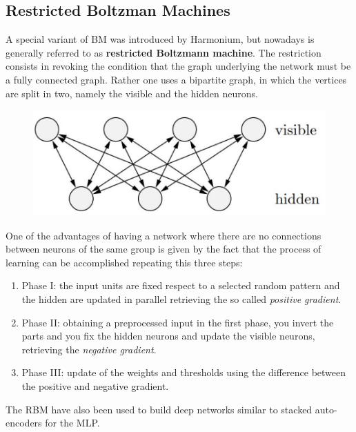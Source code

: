 \documentclass{article}
\begin{document}
\subsection{Restricted Boltzman Machines}
A special variant of BM was introduced by Harmonium, but nowadays is generally referred to as
\textbf{restricted Boltzmann machine}. The restriction consists in revoking the condition that the
graph underlying the network must be a fully connected graph. Rather one uses a bipartite
graph, in which the vertices are split in two, namely the visible and the hidden neurons.
\begin{figure}[H]
    \centering
    \includegraphics[scale=0.5]{images/boltzmann.png}
\end{figure}
One of the advantages of having a network where there are no connections between neurons of
the same group is given by the fact that the process of learning can be accomplished repeating
this three steps:
\begin{enumerate}
    \item Phase I: the input units are fixed respect to a selected random pattern
          and the hidden are updated in parallel retrieving the so called \textit{positive gradient}.
    \item Phase II: obtaining a preprocessed input in the first phase, you invert the parts
          and you fix the hidden neurons and update the visible neurons, retrieving the \textit{negative
              gradient}.
    \item Phase III: update of the weights and thresholds using the difference between the
          positive and negative gradient.
\end{enumerate}
The RBM have also been used to build deep networks similar to stacked auto-encoders for
the MLP.
\end{document}
